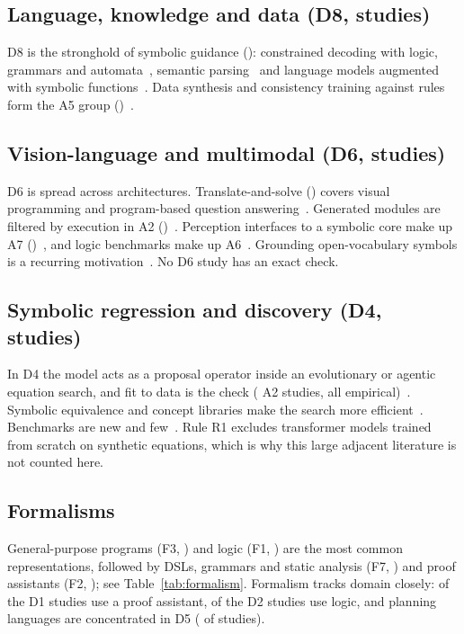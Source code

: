 \subsection{Language, knowledge and data (D8,  studies)}
D8 is the stronghold of symbolic guidance (): constrained decoding with logic, grammars and automata~\cite{lu2021neurologic,zhang2023tractable,beurerkellner2024guiding,ahmed2025controllable,suresh2025dingo}, semantic parsing~\cite{shin2021constrained,herzig2021span} and language models augmented with symbolic functions~\cite{demeter2020just}. Data synthesis and consistency training against rules form the A5 group ()~\cite{calanzone2025logically,li2025codeio,jiang2026procedural}.

\subsection{Vision-language and multimodal (D6,  studies)}
D6 is spread across architectures. Translate-and-solve () covers visual programming and program-based question answering~\cite{subramanian2023modular,hsu2023s,kamali2026neptune}. Generated modules are filtered by execution in A2 ()~\cite{chen2024genome,belouadi2024detikzify}. Perception interfaces to a symbolic core make up A7 ()~\cite{naik2025dolphin,chen2026vlms,he2026unveiling}, and logic benchmarks make up A6~\cite{gao2023lora,xu2025muslr}. Grounding open-vocabulary symbols is a recurring motivation~\cite{kamali2025nesycoco,sinha2026concept}. No D6 study has an exact check.

\subsection{Symbolic regression and discovery (D4,  studies)}
In D4 the model acts as a proposal operator inside an evolutionary or agentic equation search, and fit to data is the check ( A2 studies, all empirical)~\cite{shojaee2025sr,grayeli2024symbolic,xia2026sr,pang2026deliberate}. Symbolic equivalence and concept libraries make the search more efficient~\cite{jiang2026egg,grayeli2024symbolic}. Benchmarks are new and few~\cite{shojaee2025srbench,zheng2026newtonbench}. Rule R1 excludes transformer models trained from scratch on synthetic equations, which is why this large adjacent literature is not counted here.

\subsection{Formalisms}
General-purpose programs (F3, ) and logic (F1, ) are the most common representations, followed by DSLs, grammars and static analysis (F7, ) and proof assistants (F2, ); see Table~\ref{tab:formalism}. Formalism tracks domain closely:  of the  D1 studies use a proof assistant,  of the  D2 studies use logic, and planning languages are concentrated in D5 ( of  studies).
